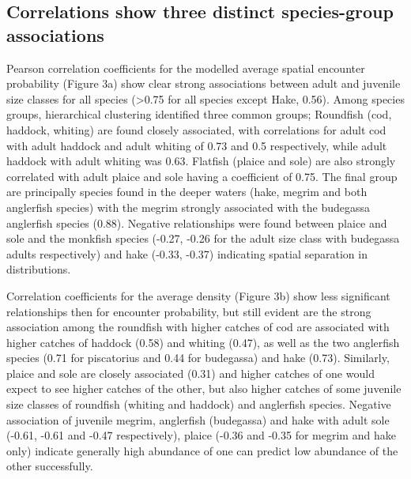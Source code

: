 \documentclass{nature}
\begin{document}
\begin{linenumbers}
[178 words]

\subsection{Correlations show three distinct species-group associations}
Pearson correlation coefficients for the modelled average spatial encounter
probability (Figure 3a) show clear strong associations between adult and
juvenile size classes for all species (\textgreater 0.75 for all species except
Hake, 0.56).  Among species groups, hierarchical clustering identified three
common groups; Roundfish (cod, haddock, whiting) are found closely associated,
with correlations for adult cod with adult haddock and adult whiting of 0.73
and 0.5 respectively, while adult haddock with adult whiting was 0.63. Flatfish
(plaice and sole) are also strongly correlated with adult plaice and sole
having a coefficient of 0.75.  The final group are principally species found in
the deeper waters (hake, megrim and both anglerfish species) with the megrim
strongly associated with the budegassa anglerfish species (0.88). Negative
relationships were found between plaice and sole and the monkfish species
(-0.27, -0.26 for the adult size class with budegassa adults respectively) and
hake (-0.33, -0.37) indicating spatial separation in distributions.

Correlation coefficients for the average density (Figure 3b) show less
significant relationships then for encounter probability, but still evident are
the strong association among the roundfish with higher catches of cod are
associated with higher catches of haddock (0.58) and whiting (0.47), as well as
the two anglerfish species (0.71 for piscatorius and 0.44 for budegassa) and
hake (0.73). Similarly, plaice and sole are closely associated (0.31) and
higher catches of one would expect to see higher catches of the other, but also
higher catches of some juvenile size classes of roundfish (whiting and haddock)
and anglerfish species. Negative association of juvenile megrim, anglerfish
(budegassa) and hake with adult sole (-0.61, -0.61 and -0.47 respectively),
plaice (-0.36 and -0.35 for megrim and hake only) indicate generally high
abundance of one can predict low abundance of the other successfully.


\end{linenumbers}
\end{document}

